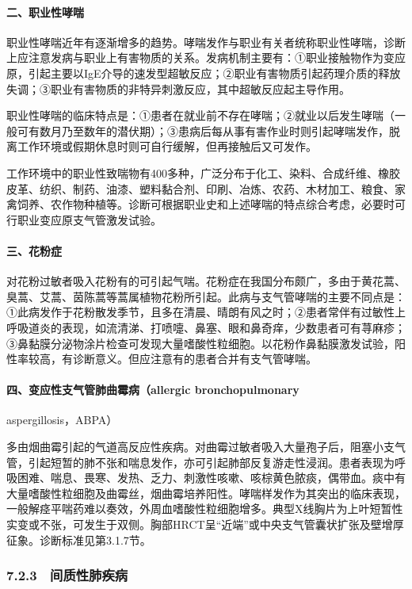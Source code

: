 \paragraph{二、职业性哮喘}

职业性哮喘近年有逐渐增多的趋势。哮喘发作与职业有关者统称职业性哮喘，诊断上应注意发病与职业上有害物质的关系。发病机制主要有：①职业接触物作为变应原，引起主要以IgE介导的速发型超敏反应；②职业有害物质引起药理介质的释放失调；③职业有害物质的非特异刺激反应，其中超敏反应起主导作用。

职业性哮喘的临床特点是：①患者在就业前不存在哮喘；②就业以后发生哮喘（一般可有数月乃至数年的潜伏期）；③患病后每从事有害作业时则引起哮喘发作，脱离工作环境或假期休息时则可自行缓解，但再接触后又可发作。

工作环境中的职业性致喘物有400多种，广泛分布于化工、染料、合成纤维、橡胶皮革、纺织、制药、油漆、塑料黏合剂、印刷、冶炼、农药、木材加工、粮食、家禽饲养、农作物种植等。诊断可根据职业史和上述哮喘的特点综合考虑，必要时可行职业变应原支气管激发试验。

\paragraph{三、花粉症}

对花粉过敏者吸入花粉有的可引起气喘。花粉症在我国分布颇广，多由于黄花蒿、臭蒿、艾蒿、茵陈蒿等蒿属植物花粉所引起。此病与支气管哮喘的主要不同点是：①此病发作于花粉散发季节，且多在清晨、晴朗有风之时；②患者常伴有过敏性上呼吸道炎的表现，如流清涕、打喷嚏、鼻塞、眼和鼻奇痒，少数患者可有荨麻疹；③鼻黏膜分泌物涂片检查可发现大量嗜酸性粒细胞。以花粉作鼻黏膜激发试验，阳性率较高，有诊断意义。但应注意有的患者合并有支气管哮喘。

\paragraph{四、变应性支气管肺曲霉病（allergic bronchopulmonary}
aspergillosis，ABPA）

多由烟曲霉引起的气道高反应性疾病。对曲霉过敏者吸入大量孢子后，阻塞小支气管，引起短暂的肺不张和喘息发作，亦可引起肺部反复游走性浸润。患者表现为呼吸困难、喘息、畏寒、发热、乏力、刺激性咳嗽、咳棕黄色脓痰，偶带血。痰中有大量嗜酸性粒细胞及曲霉丝，烟曲霉培养阳性。哮喘样发作为其突出的临床表现，一般解痉平喘药难以奏效，外周血嗜酸性粒细胞增多。典型X线胸片为上叶短暂性实变或不张，可发生于双侧。胸部HRCT呈“近端”或中央支气管囊状扩张及壁增厚征象。诊断标准见第3.1.7节。

\subsubsection{7.2.3　间质性肺疾病}

